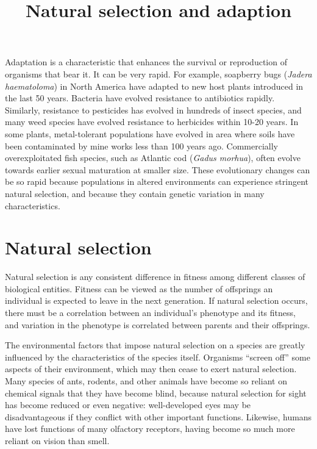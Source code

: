 \documentclass[11pt]{article}
\title{Natural selection and adaption}
\author{}
\date{}
\begin{document}
\begin{sloppypar}
  \maketitle

  \linenumbers
Adaptation is a characteristic that enhances the survival or reproduction of organisms that bear it. 
It can be very rapid. 
For example, soapberry bugs (\textit{Jadera haematoloma}) in North America have adapted to new host plants introduced in the last 50 years. 
Bacteria have evolved resistance to antibiotics rapidly. 
Similarly, resistance to pesticides has evolved in hundreds of insect species, and many weed species have evolved resistance to herbicides within 10-20 years. 
In some plants, metal-tolerant populations have evolved in area where soils have been contaminated by mine works less than 100 years ago. 
Commercially overexploitated fish species, such as Atlantic cod (\textit{Gadus morhua}), often evolve towards earlier sexual maturation at smaller size. 
These evolutionary changes can be so rapid because populations in altered environments can experience stringent natural selection, and because they contain genetic variation in many characteristics. 

\section{Natural selection}
Natural selection is any consistent difference in fitness among different classes of biological entities. 
Fitness can be viewed as the number of offsprings an individual is expected to leave in the next generation. 
If natural selection occurs, there must be a correlation between an individual's phenotype and its fitness, and variation in the phenotype is correlated between parents and their offsprings. 

\par

The environmental factors that impose natural selection on a species are greatly influenced by the characteristics of the species itself. 
Organisms “screen off” some aspects of their environment, which may then cease to exert natural selection. 
Many species of ants, rodents, and other animals have become so reliant on chemical signals that they have become blind, because natural selection for sight has become reduced or even negative: well-developed eyes may be disadvantageous if they conflict with other important functions. 
Likewise, humans have lost functions of many olfactory receptors, having become so much more reliant on vision than smell. 


\end{sloppypar}
\end{document}
